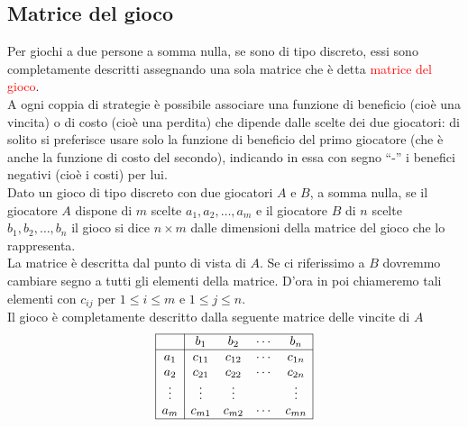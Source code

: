 \documentclass[12pt,a4paper]{article}
\begin{document}
\subsection{Matrice del gioco}
Per giochi a due persone a somma nulla, se sono di tipo discreto, essi sono completamente descritti assegnando una sola matrice che è detta \textcolor{red}{matrice del gioco}.\\
A ogni coppia di strategie è possibile associare una funzione di beneficio (cioè una vincita) o di costo (cioè una perdita) che dipende dalle scelte dei due giocatori: di solito si preferisce usare solo la funzione di beneficio del primo giocatore (che è anche la funzione di costo del secondo), indicando in essa con segno “-” i benefici negativi (cioè i costi) per lui.\\
Dato un gioco di tipo discreto con due giocatori $A$ e $B$, a somma nulla, se il giocatore $A$ dispone di $m$ scelte $a_1,a_2,\dots, a_m$ e il giocatore $B$ di $n$ scelte $b_1,b_2,\dots, b_n$ il gioco si dice $n\times m$ dalle dimensioni della matrice del gioco che lo rappresenta.\\
La matrice è descritta dal punto di vista di $A$. Se ci riferissimo a $B$ dovremmo cambiare segno a tutti gli elementi della matrice. D'ora in poi chiameremo tali elementi con $c_{ij}$ per $1\leq i \leq m$ e $1 \leq j \leq n$.\\
Il gioco è completamente descritto dalla seguente matrice delle vincite di $A$
$$\begin{array}{|c|cccc|}
\hline
& b_1& b_2 & \cdots & b_n\\ \hline
a_1 & c_{11} & c_{12} & \cdots & c_{1n}\\
a_2 & c_{21} & c_{22} & \cdots & c_{2n}\\
\vdots & \vdots & \vdots & & \vdots\\
a_m & c_{m1} & c_{m2} & \cdots & c_{mn}\\
\hline
\end{array}$$
\end{document}
